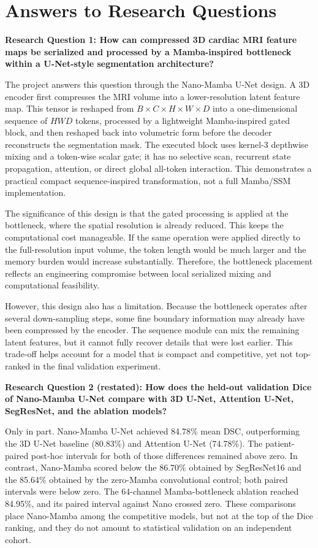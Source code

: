 \section{Answers to Research Questions}
\textbf{Research Question 1: How can compressed 3D cardiac MRI feature maps be serialized and processed by a Mamba-inspired bottleneck within a U-Net-style segmentation architecture?}

The project answers this question through the Nano-Mamba U-Net design. A 3D encoder first compresses the MRI volume into a lower-resolution latent feature map. This tensor is reshaped from $B \times C \times H \times W \times D$ into a one-dimensional sequence of $HWD$ tokens, processed by a lightweight Mamba-inspired gated block, and then reshaped back into volumetric form before the decoder reconstructs the segmentation mask. The executed block uses kernel-3 depthwise mixing and a token-wise scalar gate; it has no selective scan, recurrent state propagation, attention, or direct global all-token interaction. This demonstrates a practical compact sequence-inspired transformation, not a full Mamba/SSM implementation.

The significance of this design is that the gated processing is applied at the bottleneck, where the spatial resolution is already reduced. This keeps the computational cost manageable. If the same operation were applied directly to the full-resolution input volume, the token length would be much larger and the memory burden would increase substantially. Therefore, the bottleneck placement reflects an engineering compromise between local serialized mixing and computational feasibility.

However, this design also has a limitation. Because the bottleneck operates after several down-sampling steps, some fine boundary information may already have been compressed by the encoder. The sequence module can mix the remaining latent features, but it cannot fully recover details that were lost earlier. This trade-off helps account for a model that is compact and competitive, yet not top-ranked in the final validation experiment.

\textbf{Research Question 2 (restated): How does the held-out validation Dice of Nano-Mamba U-Net compare with 3D U-Net, Attention U-Net, SegResNet, and the ablation models?}

Only in part. Nano-Mamba U-Net achieved 84.78\% mean DSC, outperforming the 3D U-Net baseline (80.83\%) and Attention U-Net (74.78\%). The patient-paired post-hoc intervals for both of those differences remained above zero. In contrast, Nano-Mamba scored below the 86.70\% obtained by SegResNet16 and the 85.64\% obtained by the zero-Mamba convolutional control; both paired intervals were below zero. The 64-channel Mamba-bottleneck ablation reached 84.95\%, and its paired interval against Nano crossed zero. These comparisons place Nano-Mamba among the competitive models, but not at the top of the Dice ranking, and they do not amount to statistical validation on an independent cohort.

